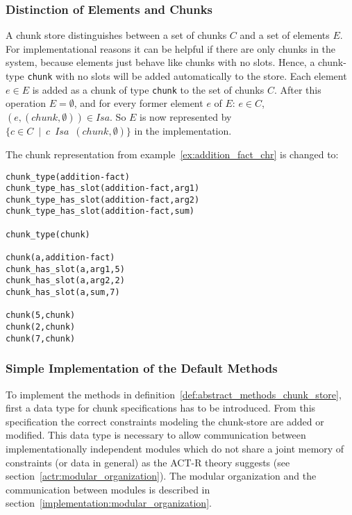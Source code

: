 \subsubsection{Distinction of Elements and Chunks}
\label{distinction_elements_chunks}

A chunk store distinguishes between a set of chunks $C$ and a set of elements $E$. For implementational reasons it can be helpful if there are only chunks in the system, because elements just behave like chunks with no slots. Hence, a chunk-type \lstinline|chunk| with no slots will be added automatically to the store. Each element $e \in E$ is added as a chunk of type \lstinline|chunk| to the set of chunks $C$. After this operation $E = \emptyset$, and for every former element $e$ of $E$: $e \in C$, $(e,(chunk,\emptyset)) \in Isa$. So $E$ is now represented by $\{ c \in C \enspace | \enspace c \enspace Isa \enspace (chunk,\emptyset) \}$ in the implementation.

\begin{example}
The chunk representation from example~\ref{ex:addition_fact_chr} is changed to:

\begin{lstlisting}
chunk_type(addition-fact)
chunk_type_has_slot(addition-fact,arg1)
chunk_type_has_slot(addition-fact,arg2)
chunk_type_has_slot(addition-fact,sum)

chunk_type(chunk)

chunk(a,addition-fact)
chunk_has_slot(a,arg1,5)
chunk_has_slot(a,arg2,2)
chunk_has_slot(a,sum,7)

chunk(5,chunk)
chunk(2,chunk)
chunk(7,chunk)
\end{lstlisting}
\end{example}


\subsubsection{Simple Implementation of the Default Methods}
\label{chunk_specification}

To implement the methods in definition~\ref{def:abstract_methods_chunk_store}, first a data type for chunk specifications has to be introduced. From this specification the correct constraints modeling the chunk-store are added or modified. This data type is necessary to allow communication between implementationally independent modules which do not share a joint memory of constraints (or data in general) as the ACT-R theory suggests (see section~\ref{actr:modular_organization}). The modular organization and the communication between modules is described in section~\ref{implementation:modular_organization}. 

